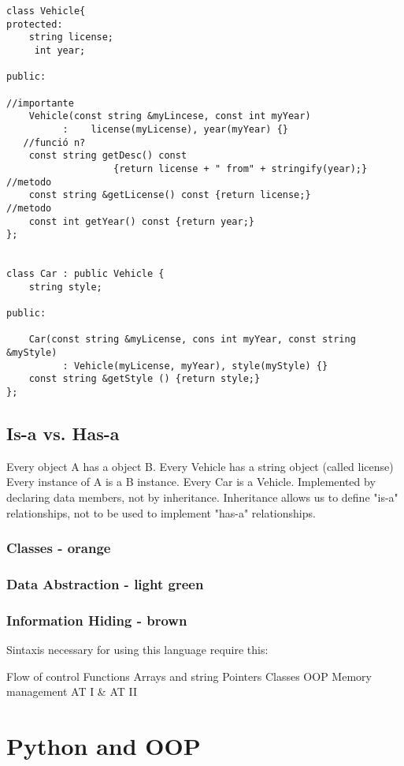 \begin{verbatim}
class Vehicle{
protected: 
    string license; 
     int year; 

public: 

//importante
    Vehicle(const string &myLincese, const int myYear)
          :    license(myLicense), year(myYear) {}
   //funció n?
    const string getDesc() const
                   {return license + " from" + stringify(year);}
//metodo    
    const string &getLicense() const {return license;}
//metodo
    const int getYear() const {return year;}
}; 


class Car : public Vehicle { 
    string style; 

public: 

    Car(const string &myLicense, cons int myYear, const string &myStyle)
          : Vehicle(myLicense, myYear), style(myStyle) {}
    const string &getStyle () {return style;}
}; 

\end{verbatim}
\subsection{Is-a vs. Has-a}

Every object A has a object B. Every Vehicle has a string object (called license)
Every instance of A is a B instance. Every Car is a Vehicle. Implemented by declaring data members, not by inheritance. 
Inheritance allows us to define "is-a" relationships, not to be used to implement "has-a" relationships.

\subsubsection{Classes - orange }
\subsubsection{Data Abstraction - light green }
\subsubsection{Information Hiding - brown}

Sintaxis necessary for using this language require this: 

Flow of control 
Functions
Arrays and string 
Pointers
Classes
OOP
Memory management
AT I & AT II 


\section{Python and OOP}

